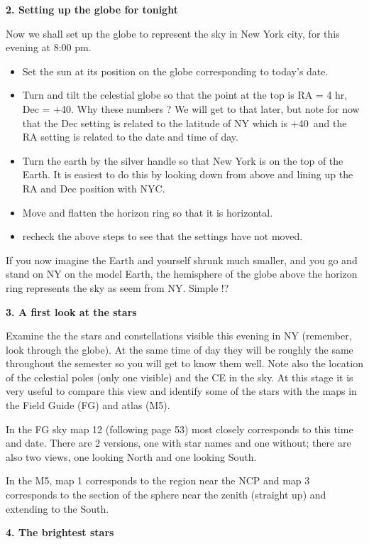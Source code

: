 \documentclass[12pt]{article}
\begin{document}
\bigskip
\noindent
{\bf 2. Setting up the globe for tonight}

\medskip
\noindent
Now we shall set up the globe to represent the sky in New York city, for this
evening at 8:00 pm.
\begin{itemize}
\item Set the sun at its position on the globe corresponding to
today's date.
\item Turn and tilt the celestial globe so that the point at the top
is RA = 4 hr, Dec = +40\deg. Why these numbers ? We will get to that
later, but note for now that the Dec setting is related to the
latitude of NY which is +40\deg\, and the RA setting is related to the
date and time of day.
\item Turn the earth by the silver handle so that New York is on the
top of the Earth. It is easiest to do this by looking down from above
and lining up the RA and Dec position with NYC.
\item Move and flatten the horizon ring so that it is horizontal.
\item recheck the above steps to see that the settings have not moved.
\end{itemize}
If you now imagine the Earth and yourself shrunk much smaller, and
you go and stand on NY on the model Earth, the hemisphere of the globe above
the horizon ring represents the sky as seem from NY. Simple !?

\bigskip\noindent
{\bf 3. A first look at the stars}

\medskip
\noindent 
Examine the the stars and constellations visible this evening in NY
(remember, look through the globe). At
the same time of day they will be roughly the same throughout the
semester so you will get to know them well. Note also the location of
the celestial poles (only one visible) and the CE in the sky. At this
stage it is very useful to compare this view and identify some of the
stars with the maps in the Field Guide (FG) and atlas (M5).

In the FG sky map 12 (following page 53) most closely corresponds to
this time and date. There are 2 versions, one with star names and one
without; there are also two views, one looking North and one looking
South.

In the M5, map 1 corresponds to the region near the NCP and map 3
corresponds to the section of the sphere near the zenith (straight up)
and extending to the South.


\newpage

\bigskip\noindent
{\bf 4. The brightest stars}
\end{document}

